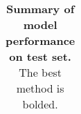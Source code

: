 \documentclass{article}\usepackage[]{graphicx}\usepackage[]{color}
\begin{document}
\begin{table}[ht]
\begin{tabular}{@{}|l|c|c|@{}}
                                                                                                                                                                                                                                                                                                                                                                                                                                                                                                                                                                                                \hline
                                                                                                                                                                                                                                                                                                                                                                                                                                                                                                                                                                                                \end{tabular}
                                                                                                                                                                                                                                                                                                                                                                                                                                                                                                                                                                                                \caption{\textbf{Summary of model performance on test set.} The best method is bolded.}
                                                                                                                                                                                                                                                                                                                                                                                                                                                                                                                                                                                                \label{tab-results}
                                                                                                                                                                                                                                                                                                                                                                                                                                                                                                                                                                                                \end{table}
\end{document}
